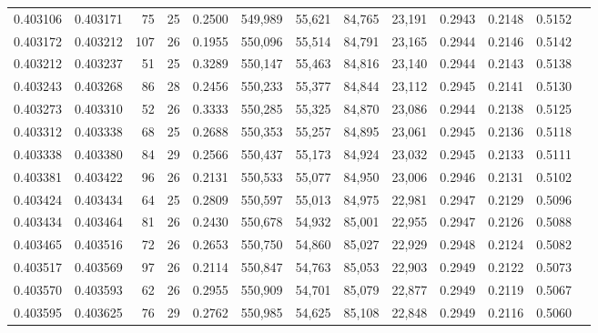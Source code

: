 \begin{tabular}{rrrrrrrrrrrrr}
0.403106 & 0.403171 &    75 &  25 &                                     0.2500 & 549,989 &  55,621 &  84,765 &  23,191 & 0.2943 & 0.2148 & 0.5152 \\
0.403172 & 0.403212 &   107 &  26 &                                     0.1955 & 550,096 &  55,514 &  84,791 &  23,165 & 0.2944 & 0.2146 & 0.5142 \\
0.403212 & 0.403237 &    51 &  25 &                                     0.3289 & 550,147 &  55,463 &  84,816 &  23,140 & 0.2944 & 0.2143 & 0.5138 \\
0.403243 & 0.403268 &    86 &  28 &                                     0.2456 & 550,233 &  55,377 &  84,844 &  23,112 & 0.2945 & 0.2141 & 0.5130 \\
0.403273 & 0.403310 &    52 &  26 &                                     0.3333 & 550,285 &  55,325 &  84,870 &  23,086 & 0.2944 & 0.2138 & 0.5125 \\
0.403312 & 0.403338 &    68 &  25 &                                     0.2688 & 550,353 &  55,257 &  84,895 &  23,061 & 0.2945 & 0.2136 & 0.5118 \\
0.403338 & 0.403380 &    84 &  29 &                                     0.2566 & 550,437 &  55,173 &  84,924 &  23,032 & 0.2945 & 0.2133 & 0.5111 \\
0.403381 & 0.403422 &    96 &  26 &                                     0.2131 & 550,533 &  55,077 &  84,950 &  23,006 & 0.2946 & 0.2131 & 0.5102 \\
0.403424 & 0.403434 &    64 &  25 &                                     0.2809 & 550,597 &  55,013 &  84,975 &  22,981 & 0.2947 & 0.2129 & 0.5096 \\
0.403434 & 0.403464 &    81 &  26 &                                     0.2430 & 550,678 &  54,932 &  85,001 &  22,955 & 0.2947 & 0.2126 & 0.5088 \\
0.403465 & 0.403516 &    72 &  26 &                                     0.2653 & 550,750 &  54,860 &  85,027 &  22,929 & 0.2948 & 0.2124 & 0.5082 \\
0.403517 & 0.403569 &    97 &  26 &                                     0.2114 & 550,847 &  54,763 &  85,053 &  22,903 & 0.2949 & 0.2122 & 0.5073 \\
0.403570 & 0.403593 &    62 &  26 &                                     0.2955 & 550,909 &  54,701 &  85,079 &  22,877 & 0.2949 & 0.2119 & 0.5067 \\
0.403595 & 0.403625 &    76 &  29 &                                     0.2762 & 550,985 &  54,625 &  85,108 &  22,848 & 0.2949 & 0.2116 & 0.5060 \\

\end{tabular}
